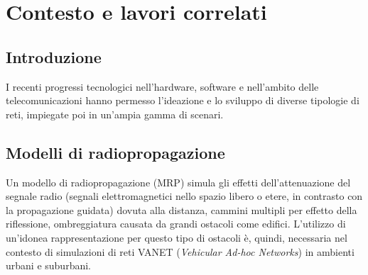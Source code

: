%
\chapter{Contesto e lavori correlati}
%
\section{Introduzione}
%
I recenti progressi tecnologici nell'hardware, software e nell'ambito delle telecomunicazioni hanno permesso
l'ideazione e lo sviluppo di diverse tipologie di reti, impiegate poi in un'ampia gamma di scenari.
%
%
\section{Modelli di radiopropagazione}
Un modello di radiopropagazione (MRP) simula gli effetti dell'attenuazione del segnale radio (segnali elettromagnetici nello spazio libero o etere, in contrasto con la propagazione guidata)
dovuta alla distanza, cammini multipli per effetto della riflessione, ombreggiatura causata da grandi ostacoli come edifici.
L'utilizzo di un'idonea rappresentazione per questo tipo di ostacoli è, quindi, necessaria nel contesto di simulazioni di reti VANET (\textit{Vehicular Ad-hoc Networks}) in ambienti urbani
e suburbani.

